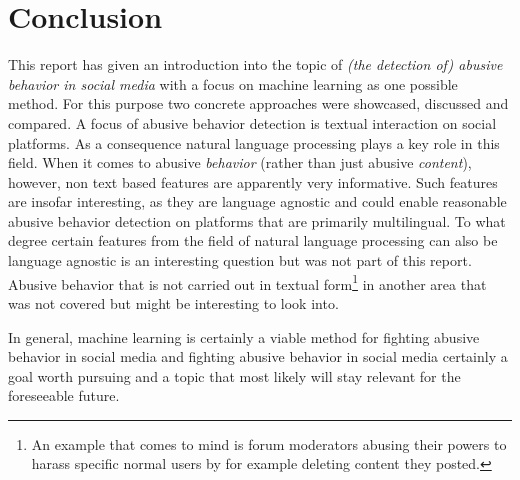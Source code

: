 \documentclass{proseminar}
\begin{document}
\section{Conclusion}
This report has given an introduction into the topic of \emph{(the detection of) abusive behavior in social media} with a focus on machine learning as one possible method. For this purpose two concrete approaches were showcased, discussed and compared. A focus of abusive behavior detection is textual interaction on social platforms. As a consequence natural language processing plays a key role in this field. When it comes to abusive \emph{behavior} (rather than just abusive \emph{content}), however, non text based features are apparently very informative. Such features are insofar interesting, as they are language agnostic and could enable reasonable abusive behavior detection on platforms that are primarily multilingual. To what degree certain features from the field of natural language processing can also be language agnostic is an interesting question but was not part of this report. Abusive behavior that is not carried out in textual form\footnote{An example that comes to mind is forum moderators abusing their powers to harass specific normal users by for example deleting content they posted.} in another area that was not covered but might be interesting to look into.

In general, machine learning is certainly a viable method for fighting abusive behavior in social media and fighting abusive behavior in social media certainly a goal worth pursuing and a topic that most likely will stay relevant for the foreseeable future.\\
\end{document}
